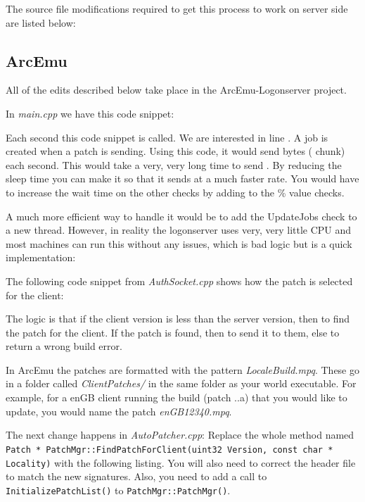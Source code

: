\documentclass{article}
\newcommand{\file}[1]{\emph{#1}\xspace}
\begin{document}
The source file modifications required to get this process to work on server side are listed below:

\subsection{ArcEmu}

All of the edits described below take place in the ArcEmu-Logonserver project.

In \file{main.cpp} we have this code snippet:


Each second this code snippet is called. We are interested in line . A job is created when a patch is sending. Using this code, it would send  bytes ( chunk) each second. This would take a very, very long time to send . By reducing the sleep time you can make it so that it sends at a much faster rate. You would have to increase the wait time on the other checks by adding to the \% value checks.

A much more efficient way to handle it would be to add the UpdateJobs check to a new thread. However, in reality the logonserver uses very, very little CPU and most machines can run this without any issues, which is bad logic but is a quick implementation:



The following code snippet from \file{AuthSocket.cpp} shows how the patch is selected for the client:

The logic is that if the client version is less than the server version, then to find the patch for the client. If the patch is found, then to send it to them, else to return a wrong build error.

In ArcEmu the patches are formatted with the pattern \file{LocaleBuild.mpq}. These go in a folder called \file{ClientPatches/} in the same folder as your world executable. For example, for a enGB client running the build   (patch ..a) that you would like to update, you would name the patch \file{enGB12340.mpq}.

The next change happens in \file{AutoPatcher.cpp}: Replace the whole method named \lstinline{Patch * PatchMgr::FindPatchForClient(uint32 Version, const char * Locality)} with the following listing. You will also need to correct the header file to match the new signatures. Also, you need to add a call to \lstinline{InitializePatchList()} to \lstinline{PatchMgr::PatchMgr()}.
\end{document}

